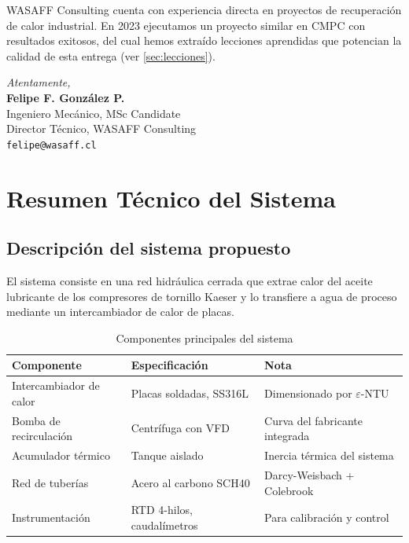 \documentclass[11pt,a4paper]{article}
\begin{document}
WASAFF Consulting cuenta con experiencia directa en proyectos de recuperación de calor industrial. En 2023 ejecutamos un proyecto similar en CMPC con resultados exitosos, del cual hemos extraído lecciones aprendidas que potencian la calidad de esta entrega (ver \cref{sec:lecciones}).

\vspace{1cm}

\begin{flushright}
\textit{Atentamente,}\\[0.5cm]
\textbf{Felipe F. González P.}\\
Ingeniero Mecánico, MSc Candidate\\
Director Técnico, WASAFF Consulting\\
\texttt{felipe@wasaff.cl}
\end{flushright}

\newpage

\section{Resumen Técnico del Sistema}

\subsection{Descripción del sistema propuesto}

El sistema consiste en una red hidráulica cerrada que extrae calor del aceite lubricante de los compresores de tornillo Kaeser y lo transfiere a agua de proceso mediante un intercambiador de calor de placas.

\begin{table}[H]
\centering
\caption{Componentes principales del sistema}
\begin{tabular}{@{}lll@{}}
\toprule
\textbf{Componente} & \textbf{Especificación} & \textbf{Nota} \\
\midrule
Intercambiador de calor & Placas soldadas, SS316L & Dimensionado por $\varepsilon$-NTU \\
Bomba de recirculación & Centrífuga con VFD & Curva del fabricante integrada \\
Acumulador térmico & Tanque aislado & Inercia térmica del sistema \\
Red de tuberías & Acero al carbono SCH40 & Darcy-Weisbach + Colebrook \\
Instrumentación & RTD 4-hilos, caudalímetros & Para calibración y control \\
\bottomrule
\end{tabular}
\end{table}
\end{document}
